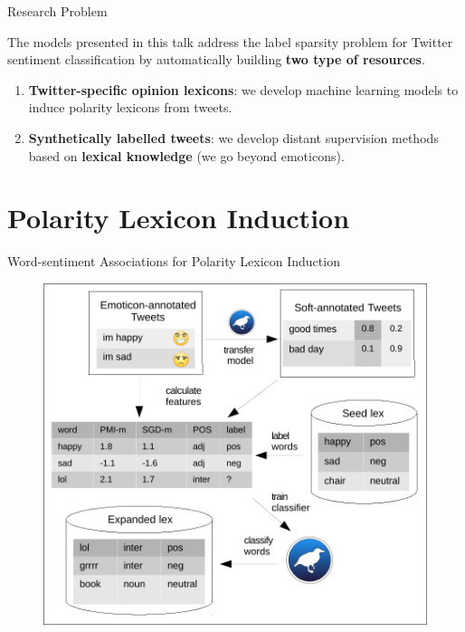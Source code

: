 \documentclass[handout]{beamer}
\begin{document}
\begin{frame}{Research Problem}

The models presented in this talk address the label sparsity problem for Twitter sentiment classification by automatically building \textbf{two type of resources}. 
\begin{enumerate}
 \item \textbf{Twitter-specific opinion lexicons}: we develop machine learning models to induce polarity lexicons from tweets. 
 \item  \textbf{Synthetically labelled tweets}: we develop distant supervision methods based on \textbf{lexical knowledge} (we go beyond emoticons). 
 \end{enumerate}

\end{frame}



\section{Polarity Lexicon Induction}


\begin{frame}{Word-sentiment Associations for Polarity Lexicon Induction}
\begin{figure}[htb]
	\centering
	 \includegraphics[scale=0.5]{pics/diagramcrop.pdf}
	\label{fig:sosgd}
\end{figure}
\end{frame}
\end{document}
